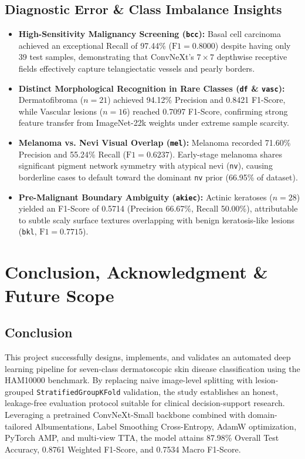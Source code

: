 \documentclass[12pt,a4paper]{article}
\begin{document}
\subsection{Diagnostic Error \& Class Imbalance Insights}
\begin{itemize}[leftmargin=*]
    \item \textbf{High-Sensitivity Malignancy Screening (\texttt{bcc}):} Basal cell carcinoma achieved an exceptional Recall of 97.44\% ($\text{F1} = 0.8000$) despite having only 39 test samples, demonstrating that ConvNeXt's $7\times 7$ depthwise receptive fields effectively capture telangiectatic vessels and pearly borders.
    \item \textbf{Distinct Morphological Recognition in Rare Classes (\texttt{df} \& \texttt{vasc}):} Dermatofibroma ($n = 21$) achieved 94.12\% Precision and 0.8421 F1-Score, while Vascular lesions ($n = 16$) reached 0.7097 F1-Score, confirming strong feature transfer from ImageNet-22k weights under extreme sample scarcity.
    \item \textbf{Melanoma vs. Nevi Visual Overlap (\texttt{mel}):} Melanoma recorded 71.60\% Precision and 55.24\% Recall ($\text{F1} = 0.6237$). Early-stage melanoma shares significant pigment network symmetry with atypical nevi (\texttt{nv}), causing borderline cases to default toward the dominant \texttt{nv} prior (66.95\% of dataset).
    \item \textbf{Pre-Malignant Boundary Ambiguity (\texttt{akiec}):} Actinic keratoses ($n = 28$) yielded an F1-Score of 0.5714 (Precision 66.67\%, Recall 50.00\%), attributable to subtle scaly surface textures overlapping with benign keratosis-like lesions (\texttt{bkl}, $\text{F1} = 0.7715$).
\end{itemize}

\section{Conclusion, Acknowledgment \& Future Scope}
\subsection{Conclusion}
This project successfully designs, implements, and validates an automated deep learning pipeline for seven-class dermatoscopic skin disease classification using the HAM10000 benchmark. By replacing naive image-level splitting with lesion-grouped \texttt{StratifiedGroupKFold} validation, the study establishes an honest, leakage-free evaluation protocol suitable for clinical decision-support research. Leveraging a pretrained ConvNeXt-Small backbone combined with domain-tailored Albumentations, Label Smoothing Cross-Entropy, AdamW optimization, PyTorch AMP, and multi-view TTA, the model attains 87.98\% Overall Test Accuracy, 0.8761 Weighted F1-Score, and 0.7534 Macro F1-Score.
\end{document}
